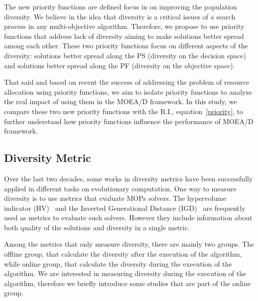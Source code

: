 The new priority functions are defined focus in on improving the population diversity. We believe in the idea that diversity is a critical issues of a search process in any multi-objective algorithm. Therefore, we propose to use priority functions that address lack of diversity aiming to make solutions better spread among each other. These two priority functions focus on different aspects of the diversity: solutions better spread along the PS (diversity on the decision space) and solutions better spread along the PF (diversity on the objective space).

That said and based on recent the success of addressing the problem of resource allocation using priority functions, we aim to isolate priority functions to analyze the real impact of using them in the MOEA/D framework. In this study, we compare these two new priority functions with the R.I., equation~\ref{priority}, to further understand how priority functions influence the performance of MOEA/D framework.




\subsection{Diversity Metric}


Over the last two decades, some works in diversity metrics have been successfully applied in different tasks on evolutionary computation. One way to measure diversity is to use metrics that evaluate MOPs solvers. The hypervolume indicator (HV)~\cite{zitzler1998multiobjective} and the Inverted Generational Distance (IGD)~\cite{zhang2008rm} are frequently used as metrics to evaluate such solvers. However they include information about both quality of the solutions and diversity in a single metric.

Among the metrics that only measure diversity, there are mainly two groups. The offline group, that calculate the diversity after the execution of the algorithm, while online group, that calculate the diversity during the execution of the algorithm. We are interested in measuring diversity during the execution of the algorithm, therefore we  briefly introduce some studies that are part of the online group.
%

